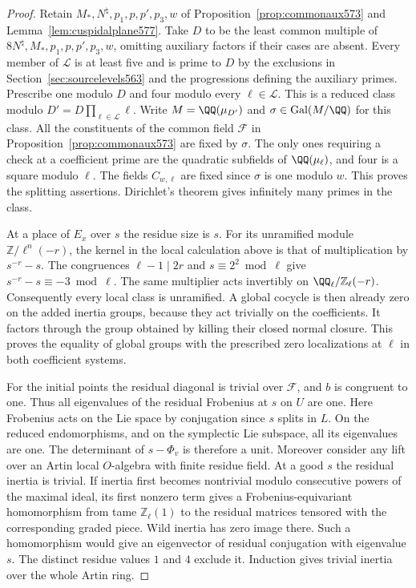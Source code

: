 \documentclass[a4paper,11pt]{article}
\theoremstyle{definition}
\theoremstyle{remark}
\newcommand{\ZZ}{\mathbb Z}\newcommand{\ord}{\operatorname{ord}}
\numberwithin{equation}{section}
\begin{document}
\begin{proof}
Retain \(M_*,N^\natural,p_1,p,p',p_3,w\) of
Proposition~\ref{prop:commonaux573} and
Lemma~\ref{lem:cuspidalplane577}. Take \(D\) to be the least
common multiple of \(8N^\natural,M_*,p_1,p,p',p_3,w\),
omitting auxiliary factors if their cases are absent.
Every member of \(\mathcal L\) is at least five and is prime
to \(D\) by the exclusions in Section~\ref{sec:sourcelevels563}
and the progressions defining the auxiliary primes. Prescribe
one modulo \(D\) and four modulo every \(\ell\in\mathcal L\).
This is a reduced class modulo
\(D'=D\prod_{\ell\in\mathcal L}\ell\). Write \(M=\QQ(\mu_{D'})\)
and \(\sigma\in\operatorname{Gal}(M/\QQ)\) for this class.
All the constituents of the common field
\(\mathcal F\) in Proposition~\ref{prop:commonaux573} are fixed
by \(\sigma\). The only ones requiring a check at a coefficient
prime are the quadratic subfields of \(\QQ(\mu_\ell)\), and
four is a square modulo \(\ell\). The fields \(C_{w,\ell}\)
are fixed since \(\sigma\) is one modulo \(w\). This proves
the splitting assertions. Dirichlet's theorem gives infinitely
many primes in the class.

At a place of \(E_x\) over \(s\) the residue size is \(s\).
For its unramified module \(\ZZ/\ell^n(-r)\), the kernel in the
local calculation above is that of multiplication by
\(s^{-r}-s\). The congruences \(\ell-1\mid 2r\) and
\(s\equiv 2^2\bmod\ell\) give \(s^{-r}-s\equiv -3\bmod\ell\).
The same multiplier acts invertibly on \(\QQ_\ell/\ZZ_\ell(-r)\).
Consequently every local class is unramified. A global cocycle
is then already zero on the added inertia groups, because
they act trivially on the coefficients. It factors through
the group obtained by killing their closed normal closure.
This proves the equality of global groups with the prescribed
zero localizations at \(\ell\) in both coefficient systems.

For the initial points the residual diagonal is trivial over
\(\mathcal F\), and \(b\) is congruent to one. Thus all eigenvalues
of the residual Frobenius at \(s\) on \(U\) are one. Here Frobenius
acts on the Lie space by conjugation since \(s\) splits in \(L\).
On the reduced endomorphisms, and on the symplectic Lie subspace,
all its eigenvalues are one. The determinant of \(s-\Phi_v\)
is therefore a unit. Moreover consider any lift over an Artin
local \(O\)-algebra with finite residue field. At a good \(s\)
the residual inertia is trivial. If inertia first becomes
nontrivial modulo consecutive powers of the maximal ideal,
its first nonzero term gives a Frobenius-equivariant
homomorphism from tame \(\ZZ_\ell(1)\) to the residual matrices
tensored with the corresponding graded piece. Wild inertia
has zero image there. Such a homomorphism would give an
eigenvector of residual conjugation with eigenvalue \(s\).
The distinct residue values \(1\) and \(4\) exclude it.
Induction gives trivial inertia over the whole Artin ring.


\end{proof}
\end{document}
